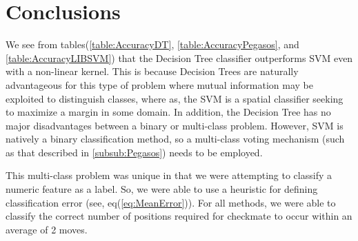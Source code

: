 \documentclass[fleqn]{article}
\begin{document}
\pagebreak
\section{Conclusions}
\label{sec:Conclusions}
We see from tables(\ref{table:AccuracyDT}, \ref{table:AccuracyPegasos}, and \ref{table:AccuracyLIBSVM}) that the Decision Tree classifier outperforms SVM even with a non-linear kernel.  This is because Decision Trees are naturally advantageous for this type of problem where mutual information may be exploited to distinguish classes, where as, the SVM is a spatial classifier seeking to maximize a margin in some domain.  In addition, the Decision Tree has no major disadvantages between a binary or multi-class problem.  However, SVM is natively a binary classification method, so a multi-class voting mechanism (such as that described in \ref{subsub:Pegasos}) needs to be employed.

This multi-class problem was unique in that we were attempting to classify a numeric feature as a label.  So, we were able to use a heuristic for defining classification error (see, eq(\ref{eq:MeanError})).  For all methods, we were able to classify the correct number of positions required for checkmate to occur within an average of 2 moves. 


 
\end{document}
